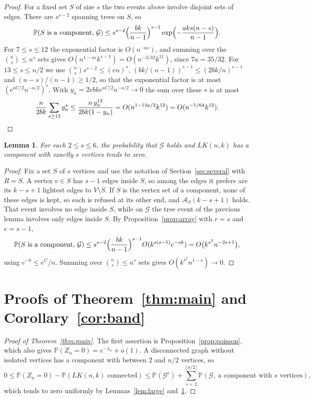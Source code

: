 \documentclass[11pt]{amsart}
\newtheorem{lemma}[theorem]{Lemma}
\theoremstyle{remark}
\numberwithin{equation}{section}
\newcommand{\Pp}{\mathbb P}
\newcommand{\1}{\mathbf 1}
\begin{document}
\begin{proof}
For a fixed set $S$ of size $s$ the two events above involve disjoint sets of edges. There are $s^{s-2}$ spanning trees on $S$, so
\begin{equation}\label{eq:compS}
\Pp(S\text{ is a component},\,\mathcal G)\le s^{s-2}\Bigl(\frac{bk}{n-1}\Bigr)^{s-1}\exp\Bigl(-\frac{aks(n-s)}{n-1}\Bigr).
\end{equation}
For $7\le s\le12$ the exponential factor is $O(n^{-as})$, and summing over the $\binom ns\le n^s$ sets gives $O(n^{1-as}k^{s-1})=O(n^{-3/32}k^{11})$, since $7a=35/32$. For $13\le s\le n/2$ we use $\binom nss^{s-2}\le(en)^s$, $(bk/(n-1))^{s-1}\le(2bk/n)^{s-1}$ and $(n-s)/(n-1)\ge1/2$, so that the exponential factor is at most $(e^{aC/2}n^{-a/2})^s$. With $y_n=2ebke^{aC/2}n^{-a/2}\to0$ the sum over these $s$ is at most
\[
\frac n{2bk}\sum_{s\ge13}y_n^s\le\frac{n\,y_n^{13}}{2bk(1-y_n)}=O(n^{1-13a/2}k^{12})=O(n^{-1/64}k^{12}).\qedhere
\]
\end{proof}

\begin{lemma}\label{lem:small}
For each $2\le s\le6$, the probability that $\mathcal G$ holds and $LK(n,k)$ has a component with exactly $s$ vertices tends to zero.
\end{lemma}

\begin{proof}
Fix a set $S$ of $s$ vertices and use the notation of Section~\ref{sec:several} with $R=S$. A vertex $v\in S$ has $s-1$ edges inside $S$, so among the edges it prefers are its $k-s+1$ lightest edges to $V\setminus S$. If $S$ is the vertex set of a component, none of these edges is kept, so each is refused at its other end, and $\mathcal A_S(k-s+1)$ holds. That event involves no edge inside $S$, while on $\mathcal G$ the tree event of the previous lemma involves only edges inside $S$. By Proposition~\ref{prop:array} with $r=s$ and $e=s-1$,
\[
\Pp(S\text{ is a component},\,\mathcal G)\le s^{s-2}\Bigl(\frac{bk}{n-1}\Bigr)^{s-1}O(k^{s(s-1)}e^{-sk})=O\bigl(k^{s^2}n^{-2s+1}\bigr),
\]
using $e^{-k}\le e^C/n$. Summing over $\binom ns\le n^s$ sets gives $O(k^{s^2}n^{1-s})\to0$.
\end{proof}

\section{Proofs of Theorem~\ref{thm:main} and Corollary~\ref{cor:band}}\label{sec:proofs}

\begin{proof}[Proof of Theorem~\ref{thm:main}]
The first assertion is Proposition~\ref{prop:poisson}, which also gives $\Pp(Z_n=0)=e^{-\lambda_n}+o(1)$. A disconnected graph without isolated vertices has a component with between $2$ and $n/2$ vertices, so
\[
0\le\Pp(Z_n=0)-\Pp(LK(n,k)\text{ connected})\le\Pp(\mathcal G^c)+\sum_{s=2}^{\lfloor n/2\rfloor}\Pp(\mathcal G,\ \text{a component with $s$ vertices}),
\]
which tends to zero uniformly by Lemmas~\ref{lem:large} and~\ref{lem:small}.
\end{proof}
\end{document}
